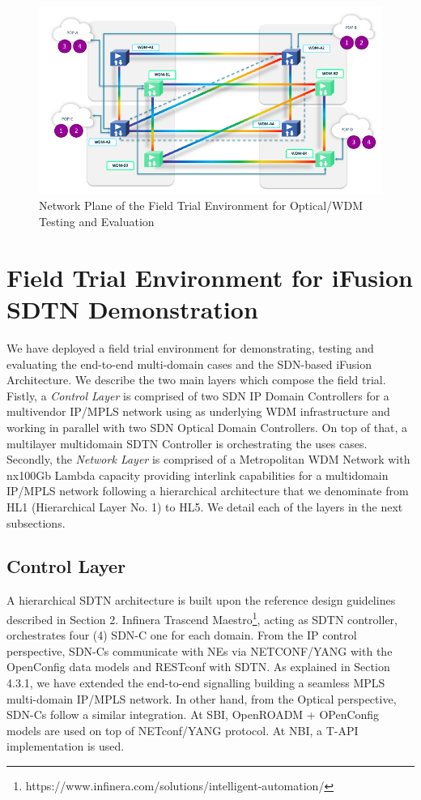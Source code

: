\documentclass[a4paper,fleqn]{cas-dc}
\begin{document}
\begin{figure}
	\centering
		\includegraphics[scale=1]{figs/field_trial_environment_optical.pdf}
	\caption{Network Plane of the Field Trial Environment for Optical/WDM Testing and Evaluation}
	\label{FIG:field_trial_optical}
\end{figure}

\section{Field Trial Environment for iFusion SDTN Demonstration}
\label{section:trial}

We have deployed a field trial environment for demonstrating, testing and evaluating the end-to-end multi-domain cases and the SDN-based iFusion Architecture. We describe the two main layers which compose the field trial. Fistly, a \textit{Control Layer} is comprised of two SDN IP Domain Controllers for a multivendor IP/MPLS network using as underlying WDM infrastructure and working in parallel with two SDN Optical Domain Controllers. On top of that, a multilayer multidomain SDTN Controller is orchestrating the uses cases. Secondly, the \textit{Network Layer} is comprised of a Metropolitan WDM Network with nx100Gb Lambda capacity providing interlink capabilities for a multidomain IP/MPLS network following a hierarchical architecture that we denominate from HL1 (Hierarchical Layer No. 1) to HL5. We detail each of the layers in the next subsections. 

\subsection{Control Layer}
A hierarchical SDTN architecture is built upon the reference design guidelines described in Section 2. Infinera Trascend Maestro\footnote{https://www.infinera.com/solutions/intelligent-automation/}, acting as SDTN controller, orchestrates four (4) SDN-C one for each domain.
From the IP control perspective, SDN-Cs communicate with NEs via NETCONF/YANG with the OpenConfig data models and RESTconf with SDTN. As explained in Section 4.3.1, we have extended the end-to-end signalling building a seamless MPLS multi-domain IP/MPLS network. In other hand, from the Optical perspective, SDN-Cs follow a similar integration. At SBI, OpenROADM + OPenConfig models are used on top of NETconf/YANG protocol. At NBI, a T-API implementation is used.  
\end{document}
